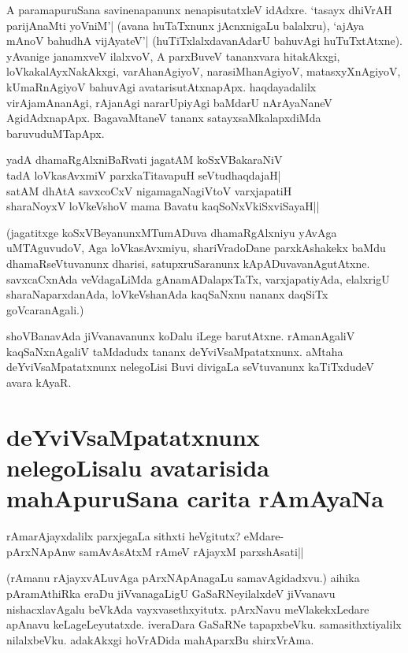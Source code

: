 A paramapuruSana savinenapanunx nenapisutatxleV idAdxre. `tasayx dhiVrAH parijAnaMti yoVniM'| (avana huTaTxnunx jAcnxnigaLu balalxru), `ajAya mAnoV bahudhA vijAyateV'|\label{150a} (huTiTxlalxdavanAdarU bahuvAgi huTuTxtAtxne). yAvanige janamxveV ilalxvoV, A parxBuveV tananxvara hitakAkxgi, loVkakalAyxNakAkxgi, varAhanAgiyoV, narasiMhanAgiyoV, matasxyXnAgiyoV, kUmaRnAgiyoV bahuvAgi avatarisutAtxnapApx. haqdayadalilx virAjamAnanAgi, rAjanAgi nararUpiyAgi baMdarU nArAyaNaneV AgidAdxnapApx. BagavaMtaneV tananx satayxsaMkalapxdiMda baruvuduMTapApx. 

\begin{shloka} 
yadA dhamaRgAlxniBaRvati jagatAM koSxVBakaraNiV\label{150b}\\ 
tadA loVkasAvxmiV parxkaTitavapuH seVtudhaqdajaH|\\ 
satAM dhAtA savxcoCxV nigamagaNagiVtoV varxjapatiH\\ 
sharaNoyxV loVkeVshoV mama Bavatu kaqSoNxV\s kiSxviSayaH||
\end{shloka} 

(jagatitxge koSxVBeyanunxMTumADuva dhamaRgAlxniyu yAvAga uMTAguvudoV, Aga loVkasAvxmiyu, shariVradoDane parxkAshakekx baMdu dhamaRseVtuvanunx dharisi, satupxruSaranunx kApADuvavanAgutAtxne. savxcaCxnAda veVdagaLiMda gAnamADalapxTaTx, varxjapatiyAda, elalxrigU sharaNaparxdanAda, loVkeVshanAda kaqSaNxnu nananx daqSiTx goVcaranAgali.) 

shoVBanavAda jiVvanavanunx koDalu iLege barutAtxne. rAmanAgaliV kaqSaNxnAgaliV taMdadudx tananx deYviVsaMpatatxnunx. aMtaha deYviVsaMpatatxnunx nelegoLisi Buvi divigaLa seVtuvanunx kaTiTxdudeV avara kAyaR. 

\section*{deYviVsaMpatatxnunx nelegoLisalu avatarisida mahApuruSana carita rAmAyaNa} 

\begin{shloka} 
rAmarAjayxdalilx parxjegaLa sithxti heVgitutx? eMdare-\\ 
pArxNApAnw samAvAsAtxM rAmeV rAjayxM parxshAsati||\label{151}
\end{shloka} 

(rAmanu rAjayxvALuvAga pArxNApAnagaLu samavAgidadxvu.) aihika pAramAthiRka eraDu jiVvanagaLigU GaSaRNeyilalxdeV jiVvanavu nishacxlavAgalu beVkAda vayxvasethxyitutx. pArxNavu meVlakekxLedare apAnavu keLageLeyutatxde. iveraDara GaSaRNe tapapxbeVku. samasithxtiyalilx nilalxbeVku. adakAkxgi hoVrADida mahAparxBu shirxVrAma. 

